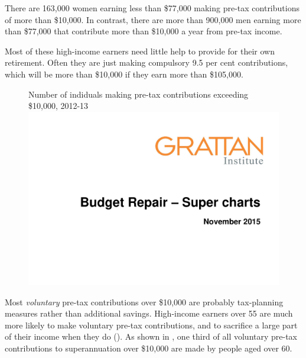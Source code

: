 There are 163,000 women earning less than \$77,000 making pre-tax contributions of more than \$10,000. In contrast, there are more than 900,000 men earning more than \$77,000 that contribute more than \$10,000 a year from pre-tax income.

Most of these high-income earners need little help to provide for their own retirement. Often they are just making compulsory 9.5 per cent contributions, which will be more than \$10,000 if they earn more than \$105,000.

\begin{figure}
%
{Number of indiduals making pre-tax contributions exceeding \$10,000, 2012-13}\label{fig:SUPER-4-6}
\includegraphics[width=\columnwidth,page=24]{super-atlas/PPTX.pdf}

\end{figure}

Most \emph{voluntary} pre-tax contributions over \$10,000 are probably tax-planning measures rather than additional savings. High-income earners over 55 are much more likely to make voluntary pre-tax contributions, and to sacrifice a large part of their income when they do (). As shown in , one third of all voluntary pre-tax contributions to superannuation over \$10,000 are made by people aged over 60. 

